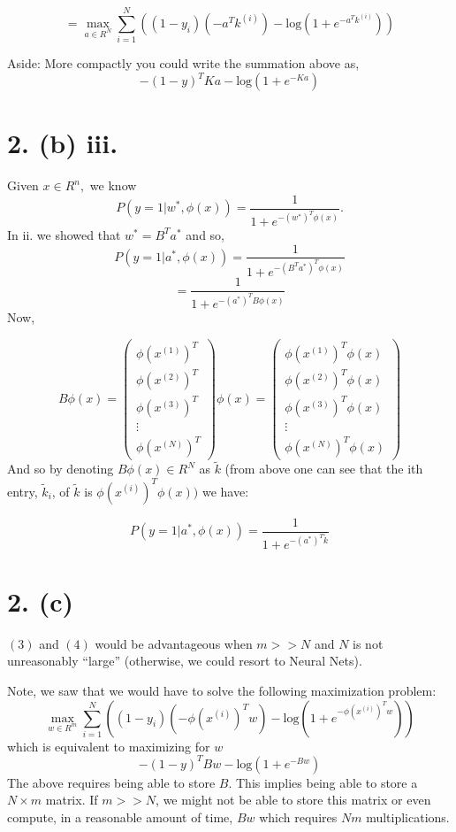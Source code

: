 \documentclass[]{article}
\begin{document}
\[=\max_{a \in R^N} \displaystyle \sum_{i=1}^{N}((1-y_i)(-a^Tk^{(i)})-\text{log}(1+e^{-a^Tk^{(i)}}))\]

Aside: More compactly you could write the summation above as,
\[-(1-y)^TKa-\text{log}(1+e^{-Ka})\]

\hypertarget{b-iii.}{%
\section{2. (b) iii.}\label{b-iii.}}

Given \(x \in R^n,\) we know
\[P(y=1|w^*,\phi(x))=\frac{1}{1+e^{-(w^*)^{T}\phi(x)}}.\] In ii. we
showed that \(w^*=B^Ta^*\) and so,
\[P(y=1|a^*,\phi(x))=\frac{1}{1+e^{-(B^Ta^*)^{T}\phi(x)}}\]
\[=\frac{1}{1+e^{-(a^*)^{T}B\phi(x)}}\] Now,

\[B\phi(x)=
\begin{pmatrix}
\phi(x^{(1)})^T \\
\phi(x^{(2)})^T  \\
\phi(x^{(3)})^T \\
\vdots    \\
\phi(x^{(N)})^T
\end{pmatrix}\phi(x)
=
\begin{pmatrix}
\phi(x^{(1)})^T\phi(x) \\
\phi(x^{(2)})^T\phi(x)  \\
\phi(x^{(3)})^T\phi(x) \\
\vdots    \\
\phi(x^{(N)})^T\phi(x)
\end{pmatrix}
\] And so by denoting \(B\phi(x) \in R^N\) as \(\tilde{k}\) (from above
one can see that the ith entry, \(\tilde{k}_i\), of \(\tilde{k}\) is
\(\phi(x^{(i)})^T\phi(x))\) we have:

\[P(y=1|a^*,\phi(x))=\frac{1}{1+e^{-(a^*)^{T}\tilde{k}}}\]

\hypertarget{c}{%
\section{2. (c)}\label{c}}

\((3)\) and \((4)\) would be advantageous when \(m >> N\) and \(N\) is
not unreasonably ``large'' (otherwise, we could resort to Neural Nets).

Note, we saw that we would have to solve the following maximization
problem:
\[\max_{w \in R^m} \displaystyle \sum_{i=1}^{N}((1-y_i)(-\phi(x^{(i)})^Tw)-\text{log}(1+e^{-\phi(x^{(i)})^Tw}))\]
which is equivalent to maximizing for \(w\)
\[-(1-y)^TBw-\text{log}(1+e^{-B w})\] The above requires being able to
store \(B\). This implies being able to store a \(N \times m\) matrix.
If \(m >> N\), we might not be able to store this matrix or even
compute, in a reasonable amount of time, \(Bw\) which requires \(Nm\)
multiplications.
\end{document}
